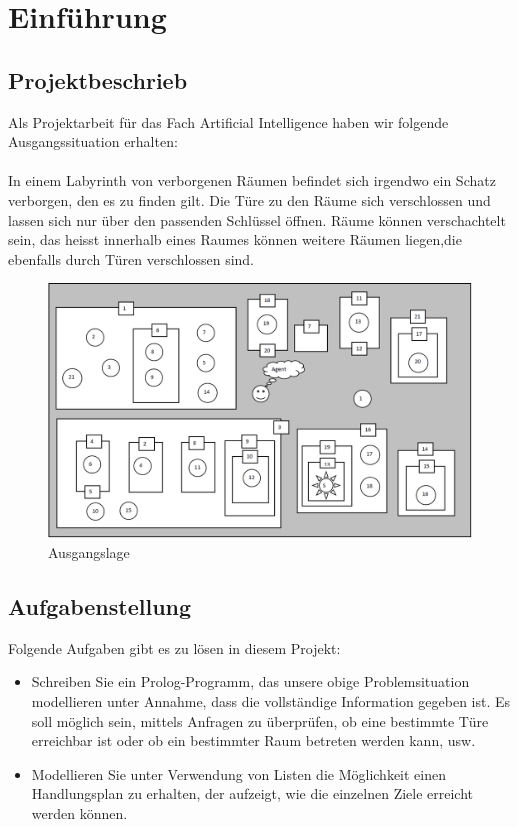 \chapter{Einführung}

\section{Projektbeschrieb}
Als Projektarbeit für das Fach Artificial Intelligence haben wir folgende Ausgangssituation
erhalten:\\
\\
\noindent
In einem Labyrinth von verborgenen Räumen befindet sich irgendwo ein Schatz verborgen, 
den es zu finden gilt. Die Türe zu den Räume sich verschlossen und lassen sich nur über 
den passenden Schlüssel öffnen. Räume können verschachtelt sein, das heisst innerhalb 
eines Raumes können weitere Räumen liegen,die ebenfalls durch Türen verschlossen sind.

\begin{figure}[h]
    \begin{center}
        \includegraphics[width=1\textwidth]{content/pictures/situation.png}
        \caption{Ausgangslage}
        \label{fig:situation}
    \end{center}
\end{figure}

\section{Aufgabenstellung}
Folgende Aufgaben gibt es zu lösen in diesem Projekt:
\begin{itemize}
    \item Schreiben Sie ein Prolog-Programm, das unsere obige Problemsituation modellieren unter Annahme, 
    dass die vollständige Information gegeben ist. Es soll möglich sein, mittels Anfragen zu 
    überprüfen, ob eine bestimmte Türe erreichbar ist oder ob ein bestimmter Raum betreten 
    werden kann, usw.
    \item Modellieren Sie unter Verwendung von Listen die Möglichkeit einen Handlungsplan zu erhalten, 
    der aufzeigt, wie die einzelnen Ziele erreicht werden können.
\end{itemize}
\newpage

